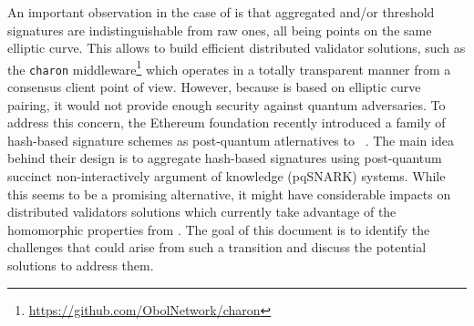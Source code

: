 An important observation in the case of \BLS is that aggregated and/or threshold \BLS signatures are indistinguishable from raw ones, all being points on the same elliptic curve.
This allows to build efficient distributed validator solutions, such as the \texttt{charon} middleware\footnote{\url{https://github.com/ObolNetwork/charon}} which operates in a totally transparent manner from a consensus client point of view.
However, because \BLS is based on elliptic curve pairing, it would not provide enough security against quantum adversaries.
To address this concern, the Ethereum foundation recently introduced a family of hash-based signature schemes as post-quantum atlernatives to \BLS~\cite{cryptoeprint:2025/055}.
The main idea behind their design is to aggregate hash-based signatures using post-quantum succinct non-interactively argument of knowledge (pqSNARK) systems.%
While this seems to be a promising alternative, it might have considerable impacts on distributed validators solutions which currently take advantage of the homomorphic properties from \BLS.
The goal of this document is to identify the challenges that could arise from such a transition and discuss the potential solutions to address them.

